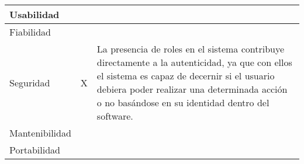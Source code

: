 \begin{center}
\begin{tabular}{ | p{2cm}| p{8cm} | p{5cm} |}
    \multicolumn{1}{|p{3.5cm}|}{\nohyphens{Usabilidad}} & \multicolumn{1}{|c|}{} & \multicolumn{1}{|p{10cm}|}{} \\ \hline
    
    \multicolumn{1}{|p{3.5cm}|}{\nohyphens{Fiabilidad}} & \multicolumn{1}{|c|}{} & \multicolumn{1}{|p{10cm}|}{} \\ \hline
    
    \multicolumn{1}{|p{3.5cm}|}{\nohyphens{Seguridad}} & \multicolumn{1}{|c|}{X} & \multicolumn{1}{|p{10cm}|}{La presencia de roles en el sistema contribuye directamente a la autenticidad, ya que con ellos el sistema es capaz de decernir si el usuario debiera poder realizar una determinada acción o no basándose en su identidad dentro del software.} \\ \hline
    
    \multicolumn{1}{|p{3.5cm}|}{\nohyphens{Mantenibilidad}} & \multicolumn{1}{|c|}{} & \multicolumn{1}{|p{10cm}|}{} \\ \hline
    
    \multicolumn{1}{|p{3.5cm}|}{\nohyphens{Portabilidad}} & \multicolumn{1}{|c|}{} & \multicolumn{1}{|p{10cm}|}{} \\
    
    \hline
  \end{tabular}
  
  \label{table:rnf:roles}
\end{center}

